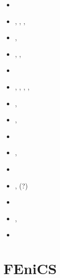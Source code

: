 \begin{small}
\begin{itemize}
\item[\twothousandone]       \textcite{modm01}
\item[\twothousandthree]     \textcite{modm03},  \textcite{wibm03}
                             \textcite{mumc03},  \textcite{wemv03}
                             \textcite{onmo03},  \textcite{onml03}
\item[\twothousandfour]      \textcite{wijns2004}, \textcite{wesm04}
\item[\twothousandfive]      \textcite{wiwg05},  \textcite{onml05},  \textcite{onmj05}
\item[\twothousandsix]       \textcite{onmm06} 
\item[\twothousandseven]     \textcite{moql07},  \textcite{gewm07}, \textcite{onjl07},
                             \textcite{dyrm07},  \textcite{onlm07}
\item[\twothousandeight]     \textcite{onlg08},  \textcite{clsm08}
\item[\twothousandnine]      \textcite{onlj09},  \textcite{retw09}
\item[\twothousandten]       \textcite{pyeg10}
\item[\twothousandeleven]    \textcite{legu11},  \textcite{retk11}
\item[\twothousandtwelve]    \textcite{lega12}
\item[\twothousandfourteen]  \textcite{recf14}, \textcite{capi14}(?)
\item[\twothousandtwentyone] \textcite{zhle21}
\item[\twothousandtwentythree] \textcite{zhll23}, \textcite{zhlc23}
\item[\twothousandtwentyfour] \textcite{recf24}
\end{itemize}
\end{small}


\section{FEniCS} 

